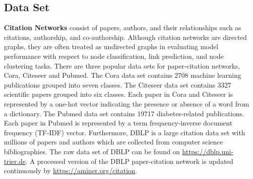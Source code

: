 




\subsection{Data Set}
	\vspace{2mm}\noindent\textbf{Citation Networks}
	consist of papers, authors, and their relationships such as citations, authorship, and co-authorship.
	Although citation networks are directed graphs, they are often treated as undirected graphs in evaluating model performance with respect to node classification, link prediction, and node clustering tasks.  There are three popular data sets for paper-citation networks, Cora, Citeseer and Pubmed.  The Cora data set contains 2708 machine learning publications grouped into seven classes.  The Citeseer data set contains 3327 scientific papers grouped into six classes. Each paper in Cora and Citeseer is represented by a one-hot vector indicating the presence or absence of a word from a dictionary.  The Pubmed data set contains 19717 diabetes-related publications. Each paper in Pubmed is represented by a term frequency-inverse document frequency (TF-IDF) vector. Furthermore, DBLP is a large citation data set with millions of papers and authors which are collected from computer science bibliographies. The raw data set of DBLP can be found on \url{https://dblp.uni-trier.de}.  A processed version of the DBLP paper-citation network is updated continuously by \url{https://aminer.org/citation}. 
	
